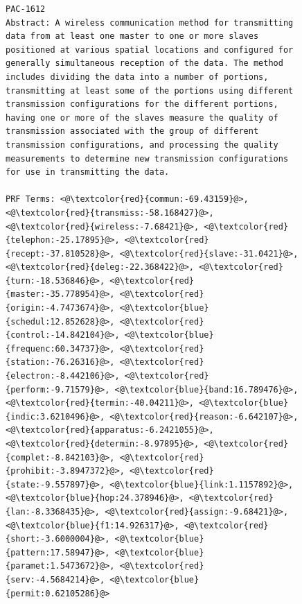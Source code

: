 \documentclass{sig-alternate}
\begin{document}
\begin{figure}[htpb]
\begin{framed}
\vspace*{-2ex}
  \centering
 \begin{lstlisting}[basicstyle=\tiny\ttfamily , linewidth=\columnwidth,breaklines=true] 
PAC-1612
Abstract: A wireless communication method for transmitting data from at least one master to one or more slaves positioned at various spatial locations and configured for generally simultaneous reception of the data. The method includes dividing the data into a number of portions, transmitting at least some of the portions using different transmission configurations for the different portions, having one or more of the slaves measure the quality of transmission associated with the group of different transmission configurations, and processing the quality measurements to determine new transmission configurations for use in transmitting the data.

PRF Terms: <@\textcolor{red}{commun:-69.43159}@>, <@\textcolor{red}{transmiss:-58.168427}@>, <@\textcolor{red}{wireless:-7.68421}@>, <@\textcolor{red}{telephon:-25.17895}@>, <@\textcolor{red}{recept:-37.810528}@>, <@\textcolor{red}{slave:-31.0421}@>, <@\textcolor{red}{deleg:-22.368422}@>, <@\textcolor{red}{turn:-18.536846}@>, <@\textcolor{red}{master:-35.778954}@>, <@\textcolor{red}{origin:-4.7473674}@>, <@\textcolor{blue}{schedul:12.852628}@>, <@\textcolor{red}{control:-14.842104}@>, <@\textcolor{blue}{frequenc:60.34737}@>, <@\textcolor{red}{station:-76.26316}@>, <@\textcolor{red}{electron:-8.442106}@>, <@\textcolor{red}{perform:-9.71579}@>, <@\textcolor{blue}{band:16.789476}@>, <@\textcolor{red}{termin:-40.04211}@>, <@\textcolor{blue}{indic:3.6210496}@>, <@\textcolor{red}{reason:-6.642107}@>, <@\textcolor{red}{apparatus:-6.2421055}@>, <@\textcolor{red}{determin:-8.97895}@>, <@\textcolor{red}{complet:-8.842103}@>, <@\textcolor{red}{prohibit:-3.8947372}@>, <@\textcolor{red}{state:-9.557897}@>, <@\textcolor{blue}{link:1.1157892}@>, <@\textcolor{blue}{hop:24.378946}@>, <@\textcolor{red}{lan:-8.3368435}@>, <@\textcolor{red}{assign:-9.68421}@>, <@\textcolor{blue}{f1:14.926317}@>, <@\textcolor{red}{short:-3.6000004}@>, <@\textcolor{blue}{pattern:17.58947}@>, <@\textcolor{blue}{paramet:1.5473672}@>, <@\textcolor{red}{serv:-4.5684214}@>, <@\textcolor{blue}{permit:0.62105286}@>


\end{lstlisting}
\end{framed}
\end{figure}
\end{document}

